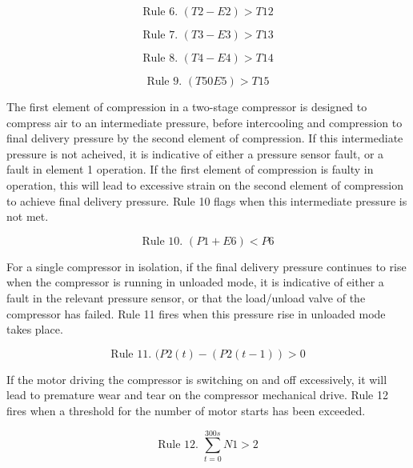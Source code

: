 \begin{equation}
\text{Rule 6. } (T2 - E2) > T12
\label{eq:rule6}
\end{equation}

\begin{equation}
\text{Rule 7. } (T3 - E3) > T13
\label{eq:rule7}
\end{equation}

\begin{equation}
\text{Rule 8. } (T4 - E4) > T14
\label{eq:rule8}
\end{equation}

\begin{equation}
\text{Rule 9. } (T5 0 E5) > T15
\label{eq:rule9}
\end{equation}

The first element of compression in a two-stage compressor is designed to compress air to an intermediate pressure, before intercooling and compression to final delivery pressure by the second element of compression. If this intermediate pressure is not acheived, it is indicative of either a pressure sensor fault, or a fault in element 1 operation. If the first element of compression is faulty in operation, this will lead to excessive strain on the second element of compression to achieve final delivery pressure. Rule 10 flags when this intermediate pressure is not met.

\begin{equation}
\text{Rule 10. } (P1 + E6) < P6
\label{eq:rule10}
\end{equation}

For a single compressor in isolation, if the final delivery pressure continues to rise when the compressor is running in unloaded mode, it is indicative of either a fault in the relevant pressure sensor, or that the load/unload valve of the compressor has failed. Rule 11 fires when this pressure rise in unloaded mode takes place.

\begin{equation}
\text{Rule 11. } (P2(t) - (P2(t-1)) > 0
\label{eq:rule11}
\end{equation}

If the motor driving the compressor is switching on and off excessively, it will lead to premature wear and tear on the compressor mechanical drive. Rule 12 fires when a threshold for the number of motor starts has been exceeded.

\begin{equation}
\text{Rule 12. } \sum_{t = 0}^{300s}N1 > 2
\label{eq:rule12}
\end{equation}

